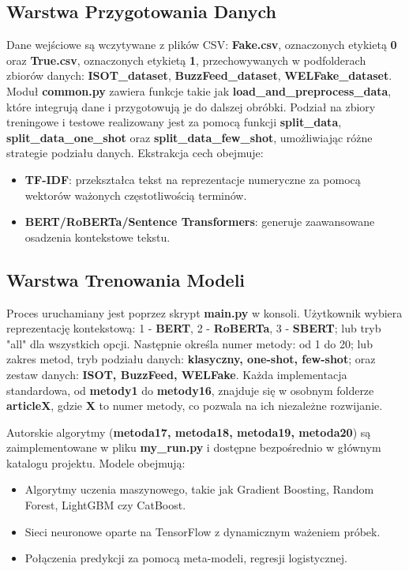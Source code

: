 \subsection{Warstwa Przygotowania Danych}
Dane wejściowe są wczytywane z plików CSV: \textbf{Fake.csv}, oznaczonych etykietą \textbf{0} oraz \textbf{True.csv}, oznaczonych etykietą \textbf{1}, przechowywanych w podfolderach zbiorów danych: \textbf{ISOT\_dataset}, \textbf{BuzzFeed\_dataset}, \textbf{WELFake\_dataset}. Moduł \textbf{common.py} zawiera funkcje takie jak \textbf{load\_and\_preprocess\_data}, które integrują dane i przygotowują je do dalszej obróbki. Podział na zbiory treningowe i testowe realizowany jest za pomocą funkcji \textbf{split\_data}, \textbf{split\_data\_one\_shot} oraz \textbf{split\_data\_few\_shot}, umożliwiając różne strategie podziału danych. Ekstrakcja cech obejmuje:
\begin{itemize}
	\item \textbf{TF-IDF}: przekształca tekst na reprezentacje numeryczne za pomocą wektorów ważonych częstotliwością terminów.
	\item \textbf{BERT/RoBERTa/Sentence Transformers}: generuje zaawansowane osadzenia kontekstowe tekstu.
\end{itemize}

\subsection{Warstwa Trenowania Modeli}
Proces uruchamiany jest poprzez skrypt \textbf{main.py} w konsoli. Użytkownik wybiera reprezentację kontekstową: 1 - \textbf{BERT}, 2 - \textbf{RoBERTa}, 3 - \textbf{SBERT}; lub tryb "all" dla wszystkich opcji. Następnie określa numer metody: od 1 do 20; lub zakres metod, tryb podziału danych: \textbf{klasyczny, one-shot, few-shot}; oraz zestaw danych: \textbf{ISOT, BuzzFeed, WELFake}. Każda implementacja standardowa, od \textbf{metody1} do \textbf{metody16}, znajduje się w osobnym folderze \textbf{articleX}, gdzie \textbf{X} to numer metody, co pozwala na ich niezależne rozwijanie.

Autorskie algorytmy (\textbf{metoda17, metoda18, metoda19, metoda20}) są zaimplementowane w pliku \textbf{my\_run.py} i dostępne bezpośrednio w głównym katalogu projektu. Modele obejmują:
\begin{itemize}
	\item Algorytmy uczenia maszynowego, takie jak Gradient Boosting, Random Forest, LightGBM czy CatBoost.
	\item Sieci neuronowe oparte na TensorFlow z dynamicznym ważeniem próbek.
	\item Połączenia predykcji za pomocą meta-modeli, regresji logistycznej.
\end{itemize}

